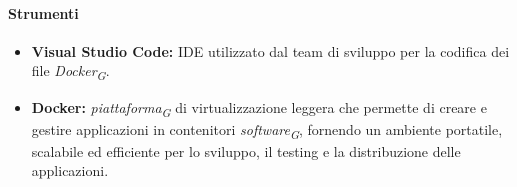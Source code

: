 \paragraph{Strumenti}
\begin{itemize}
    \item \textbf{Visual Studio Code:} IDE utilizzato dal team di sviluppo per la codifica dei file \textit{Docker}\textsubscript{\textit{G}}.
    \item \textbf{Docker:} \textit{piattaforma}\textsubscript{\textit{G}} di virtualizzazione leggera che permette di creare e gestire applicazioni in contenitori \textit{software}\textsubscript{\textit{G}}, fornendo un ambiente portatile, scalabile ed efficiente per lo sviluppo, il testing e la distribuzione delle applicazioni.
\end{itemize}
